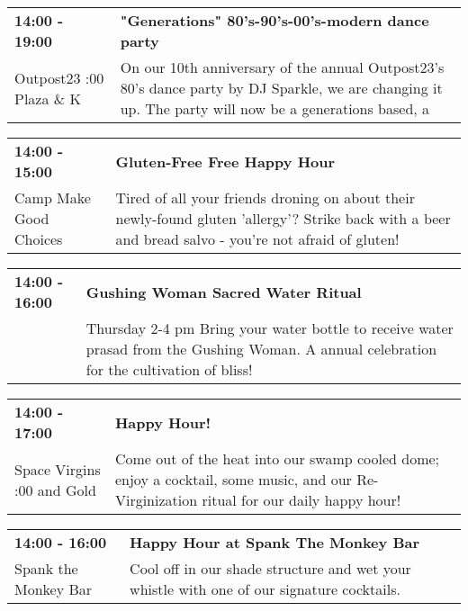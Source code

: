 \begin{tabular}{ p{1in} p{2.2in} }
    \textbf{14:00 - 19:00} & \textbf{"Generations" 80's-90's-00's-modern dance party} \\
    Outpost23 \newline 6:00 Plaza \& K & On our 10th anniversary of the annual Outpost23's 80's dance party by DJ Sparkle, we are changing it up. The party will now be a generations based, a \\
    \hline 
\end{tabular}
    
\begin{tabular}{ p{1in} p{2.2in} }
    \textbf{14:00 - 15:00} & \textbf{Gluten-Free Free Happy Hour} \\
    Camp Make Good Choices \newline  & Tired of all your friends droning on about their newly-found gluten 'allergy'? Strike back with a beer and bread salvo - you're not afraid of gluten! \\
    \hline 
\end{tabular}
    
\begin{tabular}{ p{1in} p{2.2in} }
    \textbf{14:00 - 16:00} & \textbf{Gushing Woman Sacred Water Ritual} \\
    ~ \newline  & Thursday 2-4 pm  Bring your water bottle to receive water prasad from the Gushing Woman.  A annual celebration for the cultivation of bliss! \\
    \hline 
\end{tabular}
    
\begin{tabular}{ p{1in} p{2.2in} }
    \textbf{14:00 - 17:00} & \textbf{Happy Hour!} \\
    Space Virgins \newline 6:00 and Gold & Come out of the heat into our swamp cooled dome; enjoy a cocktail, some music, and our Re-Virginization ritual for our daily happy hour! \\
    \hline 
\end{tabular}
    
\begin{tabular}{ p{1in} p{2.2in} }
    \textbf{14:00 - 16:00} & \textbf{Happy Hour at Spank The Monkey Bar} \\
    Spank the Monkey Bar \newline  & Cool off in our shade structure and wet your whistle with one of our signature cocktails. \\
    \hline 
\end{tabular}
    
